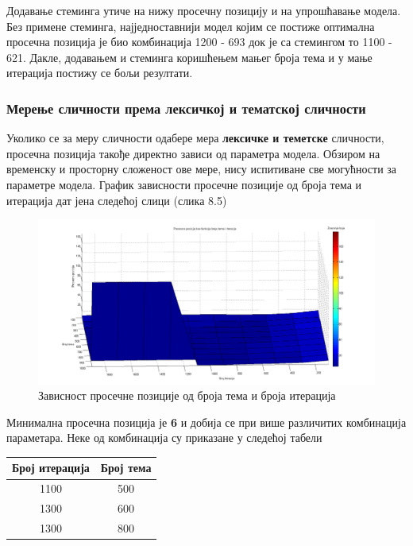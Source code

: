 Додавање стеминга утиче на нижу просечну позицију и на упрошћавање модела. Без примене стеминга, најједноставнији модел којим се постиже оптимална просечна позиција је био комбинација 1200 - 693 док је са стемингом то 1100 - 621. Дакле, додавањем и стеминга коришћењем мањег броја тема и у мање итерација постижу се бољи резултати. 


\subsubsection{Мерење сличности према лексичкој и тематској сличности}
	
Уколико се за меру сличности одабере мера  \textbf{лексичке и теметске} сличности, просечна позиција такође директно зависи од параметра модела. Обзиром на временску и просторну сложеност ове мере, нису испитиване све могућности за параметре модела. График зависности просечне позиције од броја тема и итерација дат јена следећој слици (слика 8.5)

		\begin{figure}[H]
    \centering
   \includegraphics[scale=0.3]{./Slike/distStemNoSyn.png} 
	\caption{Зависност просечне позиције од броја тема и броја итерација}
	\label{fig:slika1}
\end{figure}

Минимална просечна позиција је \textbf{6} и добија се при више различитих комбинација параметара. Неке од комбинација су приказане у следећој табели

\begin{center}
\begin{tabular}{|c|c|}
\hline
Број итерација & Број тема \\
\hline\hline
1100 & 500 \\
1300 & 600 \\
1300 & 800 \\
\hline
\end{tabular}

\end{center}



